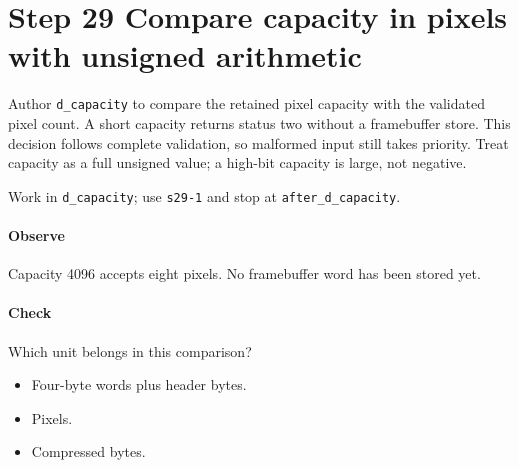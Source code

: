 \section{Step 29 Compare capacity in pixels with unsigned arithmetic}\label{qoi-s29}
Author \texttt{d\_capacity} to compare the retained pixel capacity with the validated pixel count. A short capacity returns status two without a framebuffer store. This decision follows complete validation, so malformed input still takes priority. Treat capacity as a full unsigned value; a high-bit capacity is large, not negative.

Work in \texttt{d\_capacity}; use \texttt{s29-1} and stop at \texttt{after\_d\_capacity}.

\paragraph{Observe} Capacity 4096 accepts eight pixels. No framebuffer word has been stored yet.

\paragraph{Check} Which unit belongs in this comparison?
\begin{itemize}
\item[A.] Four-byte words plus header bytes.
\item[B.] Pixels.
\item[C.] Compressed bytes.
\end{itemize}
